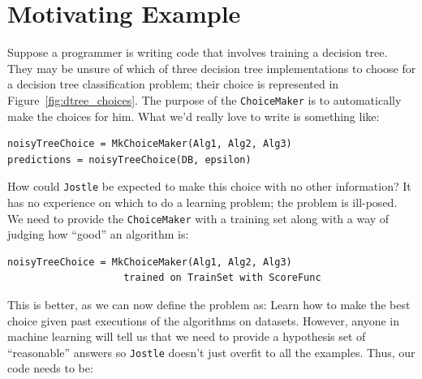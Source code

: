 \documentclass[11pt]{report}
\newcommand{\Jostle}{\texttt{Jostle}}
\renewcommand{\t}[1]{\texttt{#1}}
\begin{document}
\section{Motivating Example}
Suppose a programmer is writing code that involves training a decision tree. They may be unsure of which of three decision tree implementations to choose for a decision tree classification problem; their choice is represented in Figure~\ref{fig:dtree_choices}. The purpose of the \t{ChoiceMaker} is to automatically make the choices for him. What we'd really love to write is something like:
\begin{lstlisting}[style=MyPythonStyle]
noisyTreeChoice = MkChoiceMaker(Alg1, Alg2, Alg3)
predictions = noisyTreeChoice(DB, epsilon)
\end{lstlisting} 
How could \Jostle{} be expected to make this choice with no other information? It has no experience on which to do a learning problem; the problem is ill-posed. We need to provide the \t{ChoiceMaker} with a training set along with a way of judging how ``good'' an algorithm is:
\begin{lstlisting}[style=MyPythonStyle]
noisyTreeChoice = MkChoiceMaker(Alg1, Alg2, Alg3)
                    trained on TrainSet with ScoreFunc
\end{lstlisting} 
This is better, as we can now define the problem as: Learn how to make the best choice given past executions of the algorithms on datasets. However, anyone in machine learning will tell us that we need to provide a hypothesis set of ``reasonable'' answers so \Jostle{} doesn't just overfit to all the examples. Thus, our code needs to be:
\end{document}
